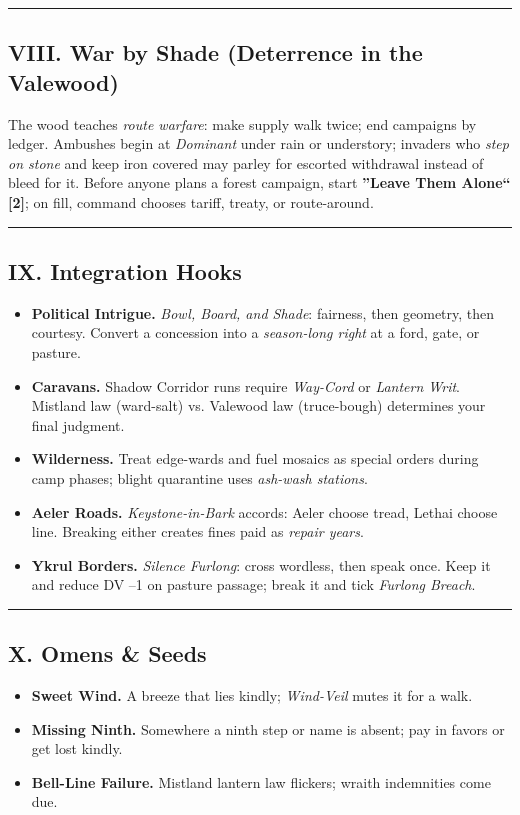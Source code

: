 \documentclass[11pt]{article}
\begin{document}
\medskip\hrule\medskip

\subsection{VIII. War by Shade (Deterrence in the Valewood)}
The wood teaches \emph{route warfare}: make supply walk twice; end campaigns by ledger. Ambushes begin at \emph{Dominant} under rain or understory; invaders who \emph{step on stone} and keep iron covered may parley for escorted withdrawal instead of bleed for it. Before anyone plans a forest campaign, start \textbf{''Leave Them Alone`` [2]}; on fill, command chooses tariff, treaty, or route-around.

\medskip\hrule\medskip

\subsection{IX. Integration Hooks}
\begin{itemize}[leftmargin=*]
  \item \textbf{Political Intrigue.} \emph{Bowl, Board, and Shade}: fairness, then geometry, then courtesy. Convert a concession into a \emph{season-long right} at a ford, gate, or pasture.
  \item \textbf{Caravans.} Shadow Corridor runs require \emph{Way-Cord} or \emph{Lantern Writ}. Mistland law (ward-salt) vs. Valewood law (truce-bough) determines your final judgment.
  \item \textbf{Wilderness.} Treat edge-wards and fuel mosaics as special orders during camp phases; blight quarantine uses \emph{ash-wash stations}.
  \item \textbf{Aeler Roads.} \emph{Keystone-in-Bark} accords: Aeler choose tread, Lethai choose line. Breaking either creates fines paid as \emph{repair years}.
  \item \textbf{Ykrul Borders.} \emph{Silence Furlong}: cross wordless, then speak once. Keep it and reduce DV --1 on pasture passage; break it and tick \emph{Furlong Breach}.
\end{itemize}

\medskip\hrule\medskip

\subsection{X. Omens \& Seeds}
\begin{itemize}[leftmargin=*]
  \item \textbf{Sweet Wind.} A breeze that lies kindly; \emph{Wind-Veil} mutes it for a walk.
  \item \textbf{Missing Ninth.} Somewhere a ninth step or name is absent; pay in favors or get lost kindly.
  \item \textbf{Bell-Line Failure.} Mistland lantern law flickers; wraith indemnities come due.
\end{itemize}
\end{document}
